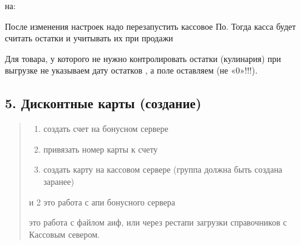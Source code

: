 \documentclass[a4paper,10pt,russian]{report}
\begin{document}
\begin{sphinxVerbatim}[commandchars=\\\{\}]
  
  
\end{sphinxVerbatim}

\sphinxAtStartPar
на:

\begin{sphinxVerbatim}[commandchars=\\\{\}]
  
  
\end{sphinxVerbatim}

\sphinxAtStartPar
После изменения настроек надо перезапустить кассовое По.
Тогда касса будет считать остатки и учитывать их при продажи

\sphinxAtStartPar
Для товара, у которого не нужно контролировать остатки (кулинария) при выгрузке не указываем дату остатков \sphinxhyphen{} , а поле 
оставляем  (не «0»!!!).


\subsection{5. Дисконтные карты (создание)}
\label{\detokenize{additional:id5}}\begin{quote}
\begin{enumerate}
%
\item {} 
\sphinxAtStartPar
создать счет на бонусном сервере

\item {} 
\sphinxAtStartPar
привязать номер карты к счету

\item {} 
\sphinxAtStartPar
создать карту на кассовом сервере (группа должна быть создана заранее)

\end{enumerate}

 и 2 это работа с апи бонусного сервера

 это работа с файлом аиф, или через рестапи загрузки справочников с Кассовым севером.

\sphinxAtStartPar
{}
\end{quote}
\end{document}
